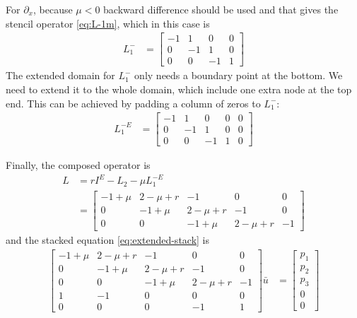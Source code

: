 \documentclass[11pt]{article}
\newcommand{\D}[1][]{\ensuremath{\partial_{#1}}}
\begin{document}
For $\D[x]$, because $\mu < 0$ backward difference should be used and that gives the stencil operator \cref{eq:L-1m}, which in this case is
\begin{align}
	L^-_1 &= \begin{bmatrix}
			-1 & 1 & 0 & 0 \\
			0 & -1 & 1 & 0 \\
			0 & 0 & -1 & 1
		\end{bmatrix}
\end{align}
The extended domain for $L^-_1$ only needs a boundary point at the bottom. We need to extend it to the whole domain, which include one extra node at the top end. This can be achieved by padding a column of zeros to $L^-_1$:
\begin{align}
	L^{-E}_1 &= \begin{bmatrix}
			-1 & 1 & 0 & 0 & 0\\
			0 & -1 & 1 & 0 & 0\\
			0 & 0 & -1 & 1 & 0
		\end{bmatrix}
\end{align}

Finally, the composed operator is
\begin{align}
	L &= rI^E - L_2 - \mu L^{-E}_1 \\
	  &= \begin{bmatrix}
		-1 + \mu & 2 -\mu + r & -1 & 0 & 0\\
		0 & -1 + \mu & 2 - \mu +r & -1 & 0\\
		0 & 0 & -1 + \mu & 2 - \mu +r & -1
	  \end{bmatrix}
\end{align}
and the stacked equation \cref{eq:extended-stack} is
\begin{align}
	\begin{bmatrix}
		-1 + \mu & 2 -\mu + r & -1 & 0 & 0\\
		0 & -1 + \mu & 2 - \mu +r & -1 & 0\\
		0 & 0 & -1 + \mu & 2 - \mu +r & -1\\
		1 & -1 & 0 & 0 & 0\\
		0 & 0 & 0 & -1 & 1
	\end{bmatrix} \bar{u} &= \begin{bmatrix} p_1 \\ p_2 \\ p_3 \\ 0 \\ 0\end{bmatrix}
\end{align}
\end{document}

